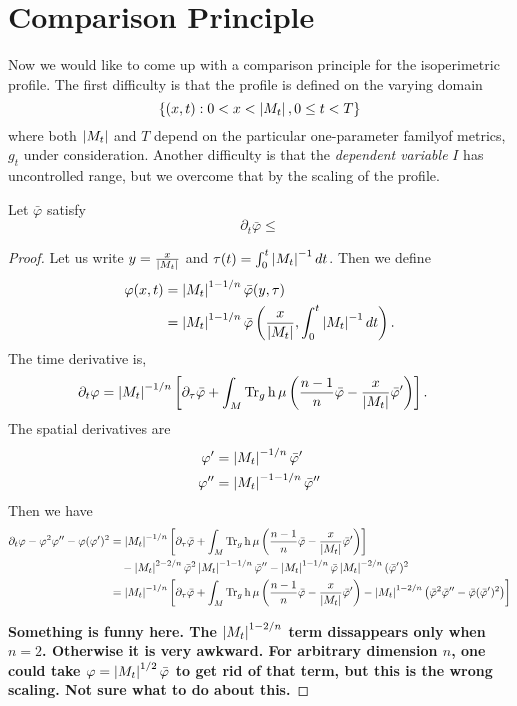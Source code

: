 \documentclass{amsart}
\begin{document}
\section{Comparison Principle}
\label{sec:comparison}

Now we would like to come up with a comparison principle for the isoperimetric profile. The first difficulty is that the profile is defined on the varying domain
\[
\{(x, t) : 0 < x < \left|{M_t}\right|, 0 \leq t < T\}
\]
where both \(\left|{M_t}\right|\) and \(T\) depend on the particular one-parameter familyof metrics, \(g_t\) under consideration. Another difficulty is that the \emph{dependent variable} \(I\) has uncontrolled range, but we overcome that by the scaling of the profile.

\begin{thm}
Let \(\bar{\varphi}\) satisfy
\[
\partial_t \bar{\varphi} \leq 
\]
\end{thm}

\begin{proof}
Let us write \(y = \frac{x}{\left|{M_t}\right|}\) and \(\tau(t) = \int_0^t \left|{M_t}\right|^{-1} dt\). Then we define
\[
\begin{split}
\varphi(x, t) &= \left|{M_t}\right|^{1-1/n} \bar{\varphi} (y, \tau) \\
&= \left|{M_t}\right|^{1-1/n} \bar{\varphi} \left(\frac{x}{\left|{M_t}\right|}, \int_0^t \left|{M_t}\right|^{-1} dt\right).
\end{split}
\]
The time derivative is,
\[
\begin{split}
\partial_t \varphi &= \left|{M_t}\right|^{-1/n}\left[\partial_{\tau} \bar{\varphi} + \int_M \operatorname{Tr}_g \operatorname{h} \mu \left(\frac{n-1}{n} \bar{\varphi} - \frac{x}{\left|{M_t}\right|} \bar{\varphi}'\right)\right].
\end{split}
\]
The spatial derivatives are
\begin{align*}
\varphi' &= \left|{M_t}\right|^{-1/n} \bar{\varphi}' \\
\varphi'' &= \left|{M_t}\right|^{-1-1/n} \bar{\varphi}''
\end{align*}
Then we have
\[
\begin{split}
\partial_t \varphi - \varphi^2 \varphi'' - \varphi(\varphi')^2 &= \left|{M_t}\right|^{-1/n}\left[\partial_{\tau} \bar{\varphi} + \int_M \operatorname{Tr}_g \operatorname{h} \mu \left(\frac{n-1}{n} \bar{\varphi} - \frac{x}{\left|{M_t}\right|} \bar{\varphi}'\right)\right] \\
&\quad - \left|{M_t}\right|^{2-2/n} \bar{\varphi}^2 \left|{M_t}\right|^{-1-1/n} \bar{\varphi}'' - \left|{M_t}\right|^{1-1/n} \bar{\varphi} \left|{M_t}\right|^{-2/n} (\bar{\varphi}')^2 \\
&= \left|{M_t}\right|^{-1/n}\left[\partial_{\tau} \bar{\varphi} + \int_M \operatorname{Tr}_g \operatorname{h} \mu \left(\frac{n-1}{n} \bar{\varphi} - \frac{x}{\left|{M_t}\right|} \bar{\varphi}'\right) - \left|{M_t}\right|^{1-2/n} \left(\bar{\varphi}^2 \bar{\varphi}'' - \bar{\varphi} (\bar{\varphi}')^2\right)\right]
\end{split}
\]

\textbf{Something is funny here. The \(\left|{M_t}\right|^{1-2/n}\) term dissappears only when \(n=2\). Otherwise it is very awkward. For arbitrary dimension \(n\), one could take \(\varphi = \left|{M_t}\right|^{1/2} \bar{\varphi}\) to get rid of that term, but this is the wrong scaling. Not sure what to do about this.}
\end{proof}
\end{document}
